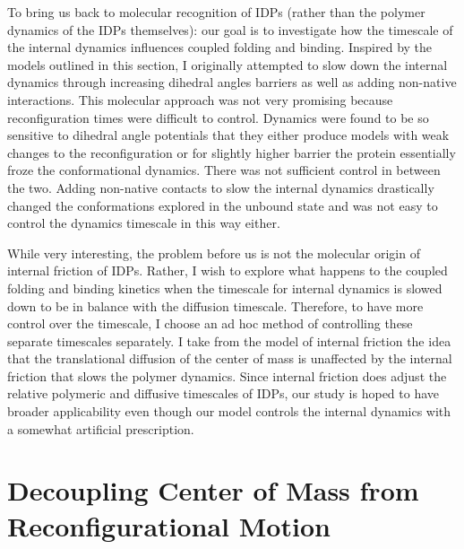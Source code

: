 \documentclass[../talant.diss.submit.tex]{subfiles}
\begin{document}
To bring us back to molecular recognition of IDPs (rather than the polymer
dynamics of the IDPs themselves): our goal is to investigate how the timescale of
the internal dynamics influences coupled folding and binding. Inspired by the
models outlined in this section, I originally attempted to slow down the
internal dynamics through increasing dihedral angles barriers as well as adding
non-native interactions. This molecular approach was not very promising
because reconfiguration times were difficult to control.
Dynamics were found to be so sensitive to dihedral angle potentials that they
either produce models with weak changes to the reconfiguration or for slightly higher
barrier the protein essentially froze the conformational dynamics. There was not sufficient control in between the two. Adding non-native contacts to
slow the internal dynamics drastically changed the conformations explored in the
unbound state and %
was not easy to control the dynamics timescale in this way either. 

While very interesting, the problem before us is not the molecular origin of internal friction of IDPs.
Rather, I wish to explore what happens to the coupled folding and binding kinetics when the timescale
for internal
dynamics is slowed down to be in balance with the diffusion timescale.
Therefore, to have more control
over the timescale, I choose an ad hoc method of controlling these separate timescales separately.
I take from the model of internal friction the idea that the translational diffusion of the center
of mass is unaffected by the internal friction that slows the polymer dynamics.
Since internal friction does adjust the relative polymeric and diffusive timescales of IDPs, our
study is hoped to have broader applicability even though our model controls the internal dynamics
with a somewhat artificial prescription. 

%
%
\section{\textbf{Decoupling Center of Mass from Reconfigurational Motion}}\label{sect:four_three}
%
%
\end{document}
